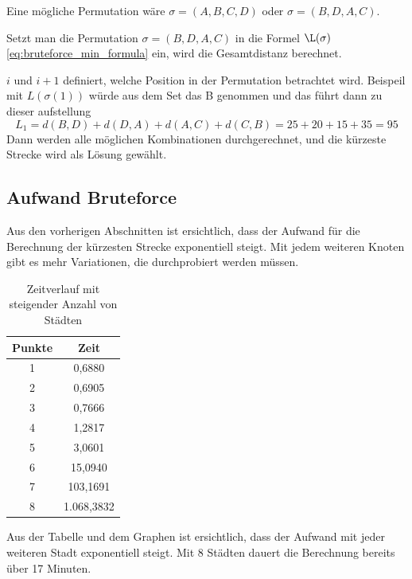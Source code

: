 Eine mögliche Permutation wäre $\sigma = (A, B, C, D)$ oder $\sigma = (B, D, A, C)$.

Setzt man die Permutation $\sigma = (B, D, A, C)$ in die Formel $\L(\sigma)$
\ref{eq:bruteforce_min_formula} ein, wird die Gesamtdistanz berechnet.


\(i\) und \(i+1\) definiert, welche Position in der Permutation betrachtet wird. 
Beispeil mit \( L(\sigma(1)) \) würde aus dem Set das B genommen und das führt 
dann zu dieser aufstellung
\begin{equation}
    L_1 = d(B, D) + d(D, A) + d(A, C) + d(C, B)
    = 25 + 20 + 15 + 35 = 95
\end{equation}
Dann werden alle möglichen Kombinationen durchgerechnet, und die kürzeste 
Strecke wird als Lösung gewählt.

\subsection{Aufwand Bruteforce
\label{buch:paper:varalg:subsection:bruteforce_efforts}}
Aus den vorherigen Abschnitten ist ersichtlich, dass der Aufwand für die 
Berechnung der kürzesten Strecke exponentiell steigt. Mit jedem weiteren 
Knoten gibt es mehr Variationen, die durchprobiert werden müssen. 

\begin{table}[ht]
    \centering
    \caption{Zeitverlauf mit steigender Anzahl von Städten}
    \begin{tabular}{cc}
        \toprule
        Punkte & Zeit       \\
        \midrule
        1      & 0,6880     \\
        2      & 0,6905     \\
        3      & 0,7666     \\
        4      & 1,2817     \\
        5      & 3,0601     \\
        6      & 15,0940    \\
        7      & 103,1691   \\
        8      & 1.068,3832 \\
        \bottomrule
    \end{tabular}
\end{table}


Aus der Tabelle und dem Graphen ist ersichtlich, dass der Aufwand mit 
jeder weiteren Stadt exponentiell steigt. Mit 8 Städten dauert die
Berechnung bereits über 17 Minuten.
